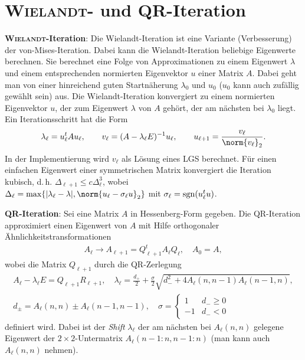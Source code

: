 \section{%
    \textsc{Wielandt}- und QR-Iteration%
}

\textbf{\textsc{Wielandt}-Iteration}:
Die Wielandt-Iteration ist eine Variante (Verbesserung) der von-Mises-Iteration.
Dabei kann die Wielandt-Iteration beliebige Eigenwerte berechnen.
Sie berechnet eine Folge von Approximationen zu einem Eigenwert
$\lambda$ und einem entsprechenden normierten Eigenvektor $u$ einer Matrix $A$.
Dabei geht man von einer hinreichend guten Startnäherung $\lambda_0$ und $u_0$
($u_0$ kann auch zufällig gewählt sein) aus.
Die Wielandt-Iteration konvergiert zu einem normierten Eigenvektor $u$,
der zum Eigenwert $\lambda$ von $A$ gehört, der am nächsten bei $\lambda_0$
liegt. \\
Ein Iterationsschritt hat die Form
\begin{align*}
    \lambda_\ell = u_\ell^t A u_\ell, \qquad
    v_\ell = (A - \lambda_\ell E)^{-1} u_\ell, \qquad
    u_{\ell + 1} = \frac{v_\ell}{\norm{v_\ell}_2}.
\end{align*}
In der Implementierung wird $v_\ell$ als Lösung eines LGS berechnet.
Für einen einfachen Eigenwert einer symmetrischen Matrix konvergiert die
Iteration kubisch, d.\,h. $\Delta_{\ell+1} \le c \Delta_\ell^3$, wobei \\
$\Delta_\ell = \max\{|\lambda_\ell - \lambda|,
\norm{u_\ell - \sigma_\ell u}_2\}$
mit $\sigma_\ell = \operatorname{sgn}(u_\ell^t u)$.

\linie

\textbf{QR-Iteration}:
Sei eine Matrix $A$ in Hessenberg-Form gegeben.
Die QR-Iteration approximiert einen Eigenwert von $A$ mit Hilfe orthogonaler
Ähnlichkeitstransformationen
\begin{align*}
    A_\ell \rightarrow A_{\ell+1} = Q_{\ell+1}^t A_\ell Q_\ell, \quad
    A_0 = A,
\end{align*}
wobei die Matrix $Q_{\ell+1}$ durch die QR-Zerlegung
\[\begin{array}{c}
    A_\ell - \lambda_\ell E = Q_{\ell+1} R_{\ell+1}, \quad
    \lambda_\ell = \frac{d_+}{2} + \frac{\sigma}{2}
    \sqrt{d_-^2 + 4 A_\ell(n, n - 1) A_\ell(n - 1, n)},\\
    d_\pm = A_\ell(n, n) \pm A_\ell(n - 1, n - 1), \quad
    \sigma = \begin{cases}1 & d_- \ge 0 \\ -1 & d_- < 0\end{cases}
\end{array}\]
definiert wird.
Dabei ist der \emph{Shift} $\lambda_\ell$ der am nächsten bei
$A_\ell(n, n)$ gelegene Eigenwert der $2 \times 2$-Untermatrix
$A_\ell(n - 1:n, n - 1:n)$ (man kann auch $A_\ell(n, n)$ nehmen).

